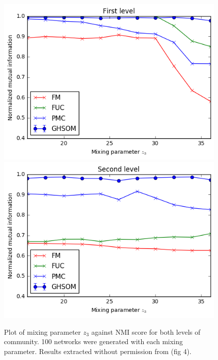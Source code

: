 \documentclass{article}
\begin{document}
\begin{figure}
\centering
\includegraphics[scale=0.65]{first_level.png}
\includegraphics[scale=0.65]{second_level.png}
\caption{Plot of mixing parameter $z_3$ against NMI score for both levels of community. 100 networks were generated with each mixing parameter. Results extracted without permission from \protect\cite{yang2013hierarchical} (fig 4).}
\label{synthetic_experiment}
\end{figure}

\end{document}
